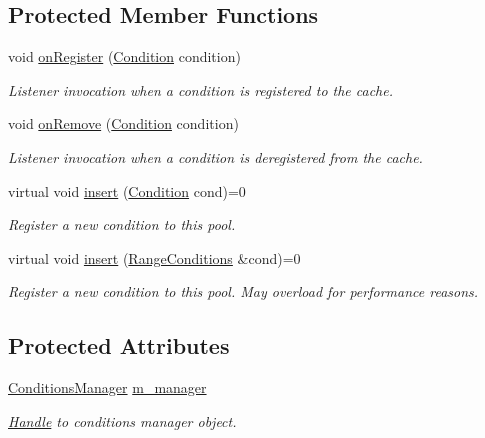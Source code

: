 \subsection*{Protected Member Functions}
\begin{DoxyCompactItemize}
\item 
void \hyperlink{class_d_d4hep_1_1_conditions_1_1_conditions_pool_aac40c7730b4ef3cb08253c98a6d79ee2}{onRegister} (\hyperlink{class_d_d4hep_1_1_conditions_1_1_condition}{Condition} condition)
\begin{DoxyCompactList}\small\item\em Listener invocation when a condition is registered to the cache. \item\end{DoxyCompactList}\item 
void \hyperlink{class_d_d4hep_1_1_conditions_1_1_conditions_pool_aadcb09f91ee89996577258c1d9443c88}{onRemove} (\hyperlink{class_d_d4hep_1_1_conditions_1_1_condition}{Condition} condition)
\begin{DoxyCompactList}\small\item\em Listener invocation when a condition is deregistered from the cache. \item\end{DoxyCompactList}\item 
virtual void \hyperlink{class_d_d4hep_1_1_conditions_1_1_conditions_pool_a90abd47fd41d04d96b180aa244786b01}{insert} (\hyperlink{class_d_d4hep_1_1_conditions_1_1_condition}{Condition} cond)=0
\begin{DoxyCompactList}\small\item\em Register a new condition to this pool. \item\end{DoxyCompactList}\item 
virtual void \hyperlink{class_d_d4hep_1_1_conditions_1_1_conditions_pool_a0acc07312e725ef5fb80e0de276b501e}{insert} (\hyperlink{namespace_d_d4hep_1_1_conditions_ae765f0140a33973a430280f02b6062f4}{RangeConditions} \&cond)=0
\begin{DoxyCompactList}\small\item\em Register a new condition to this pool. May overload for performance reasons. \item\end{DoxyCompactList}\end{DoxyCompactItemize}
\subsection*{Protected Attributes}
\begin{DoxyCompactItemize}
\item 
\hyperlink{class_d_d4hep_1_1_conditions_1_1_conditions_manager}{ConditionsManager} \hyperlink{class_d_d4hep_1_1_conditions_1_1_conditions_pool_aae8c23b1a47bad8034196316a2fd41c9}{m\_\-manager}
\begin{DoxyCompactList}\small\item\em \hyperlink{class_d_d4hep_1_1_handle}{Handle} to conditions manager object. \item\end{DoxyCompactList}\end{DoxyCompactItemize}
